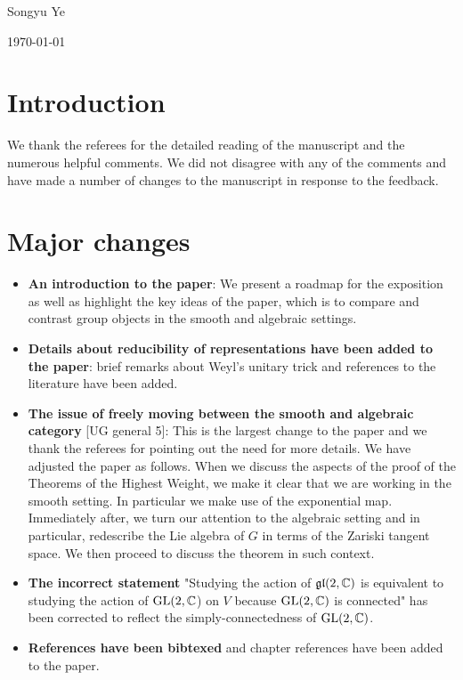 \documentclass[12pt]{article}
\begin{document}
Songyu Ye

\today

\section{Introduction}
We thank the referees for the detailed reading of the manuscript and 
the numerous helpful comments. We did not disagree
with any of the comments and have made a number of changes to the manuscript in response to 
the feedback.

\section{Major changes}
\begin{itemize}
    \item \textbf{An introduction to the paper}: We present a roadmap for the exposition as well as highlight
    the key ideas of the paper, which is to compare and contrast group objects in the smooth and algebraic 
    settings.
    \item \textbf{Details about reducibility of representations have been added to the paper}: brief remarks
    about Weyl's unitary trick and references to the literature have been added.
    \item \textbf{The issue of freely moving between the smooth and algebraic category} [UG general 5]:
    This is the largest change to the paper and we thank the referees for pointing out
    the need for more details. We have adjusted the paper as follows. When we discuss the aspects
    of the proof of the Theorems of the Highest Weight, we make it clear that we are working in the smooth setting. In particular
    we make use of the exponential map. Immediately after, we turn our attention to the algebraic setting and in particular, 
    redescribe the Lie algebra of $G$ in terms of the Zariski tangent space. We then proceed to discuss the theorem in such context.
    \item \textbf{The incorrect statement} "Studying the action of $\operatorname{\mathfrak{gl}}(2,\mathbb{C})$ is
    equivalent to studying the action of $\operatorname{GL}(2,\mathbb{C}$) on $V$ because $\operatorname{GL}(2, \mathbb{C})$ is
    connected" has been corrected to reflect the simply-connectedness of $\operatorname{GL}(2, \mathbb{C})$.
    \item \textbf{References have been bibtexed} and chapter references have been added to the paper.
\end{itemize}
\end{document}
